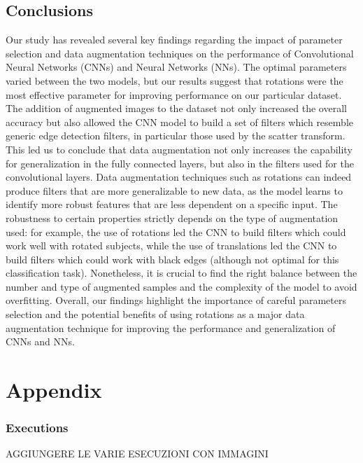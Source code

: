 \documentclass{report}
\begin{document}
\chapter{Conclusions}

Our study has revealed several key findings regarding the impact of parameter selection and data augmentation 
techniques on the performance of Convolutional Neural Networks (CNNs) and Neural Networks (NNs). The optimal 
parameters varied between the two models, but our results suggest that rotations were the most effective 
parameter for improving performance on our particular dataset.
The addition of augmented images to the dataset not only increased the overall accuracy but also allowed the CNN model to build a set of filters which resemble generic edge detection filters, in particular those used by the scatter transform.
This led us to conclude that data augmentation not only increases the capability for generalization in the fully connected layers, but also in the filters used for the convolutional layers.
Data augmentation techniques such as rotations can indeed produce filters that 
are more generalizable to new data, as the model learns to identify more robust features that are less 
dependent on a specific input. The robustness to certain properties strictly depends on the type of augmentation used: 
for example, the use of rotations led the CNN to build filters which could work well with rotated subjects, while the use of translations led the CNN to build filters which could work with black edges (although not optimal for this classification task). 
Nonetheless, it is crucial to find the right balance between the 
number and type of augmented samples and the complexity of the model to avoid overfitting. Overall, our findings 
highlight the importance of careful parameters selection and the potential benefits of using rotations as a major data 
augmentation technique for improving the performance and generalization of CNNs and NNs.

\pagebreak

\part{Appendix}
\appendix

\section{Executions}
AGGIUNGERE LE VARIE ESECUZIONI CON IMMAGINI\\
\end{document}
